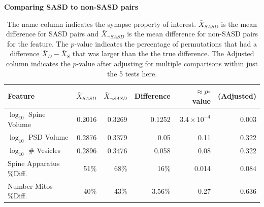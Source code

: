 \documentclass[12pt]{article}
\theoremstyle{definition}
\begin{document}
\begin{table}[ht]\label{tab:sasdVSrest}
\caption{The name column indicates the synapse property of interest.
$\bar{X}_{SASD}$ is the mean difference for SASD pairs and $\bar{X}_{\neg SASD}$ is the mean difference for non-SASD pairs for the feature.
 The $p$-value indicates the percentage of permutations that had a difference $\bar{X}_D-\bar{X}_S$ that was larger than the the true difference. 
 The Adjusted column indicates the $p$-value after adjusting for multiple comparisons within just the 5 tests here. }
\centering
\textbf{Comparing SASD to non-SASD pairs}\\
\begin{tabular}{lrrrrr}
  \hline
Feature                          & $\bar{X}_{SASD}$ & $\bar{X}_{\neg SASD}$ & Difference & $\approx p$-value      & (Adjusted)\\
  \hline
$\log_{10}$ Spine Volume     & 0.2016           & 0.3269                & 0.1252    & $3.4\times 10^{-4}$  & 0.003  \\
$\log_{10}$ PSD Volume       & 0.2876           & 0.3379                & 0.05      & 0.11   & 0.322  \\
$\log_{10}$ \# Vesicles      & 0.2896           & 0.3476                & 0.058     & 0.08  & 0.322  \\
Spine Apparatus \%Diff. & 51\%             & 68\%                  & 16\%      & 0.014  & 0.084  \\
Number Mitos \%Diff.    & 40\%             & 43\%                  & 3.56\%    & 0.27  & 0.636  \\
   \hline
\end{tabular}
\end{table}






\end{document}
